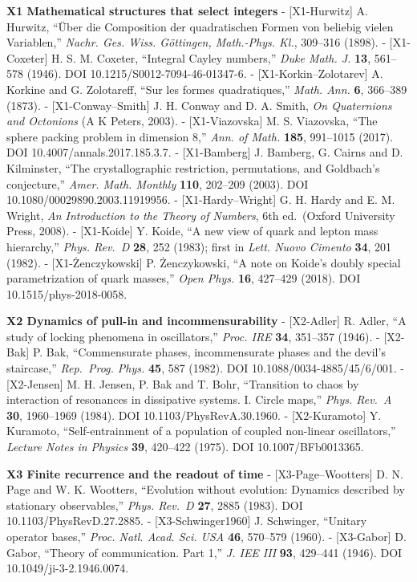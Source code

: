 \documentclass[
  a4paper,
]{article}
\begin{document}
\textbf{X1 Mathematical structures that select integers} -
{[}X1-Hurwitz{]} A. Hurwitz, ``Über die Composition der quadratischen
Formen von beliebig vielen Variablen,'' \emph{Nachr. Ges. Wiss.
Göttingen, Math.-Phys. Kl.}, 309--316 (1898). - {[}X1-Coxeter{]} H. S.
M. Coxeter, ``Integral Cayley numbers,'' \emph{Duke Math. J.}
\textbf{13}, 561--578 (1946). DOI 10.1215/S0012-7094-46-01347-6. -
{[}X1-Korkin--Zolotarev{]} A. Korkine and G. Zolotareff, ``Sur les
formes quadratiques,'' \emph{Math. Ann.} \textbf{6}, 366--389 (1873). -
{[}X1-Conway--Smith{]} J. H. Conway and D. A. Smith, \emph{On
Quaternions and Octonions} (A K Peters, 2003). - {[}X1-Viazovska{]} M.
S. Viazovska, ``The sphere packing problem in dimension 8,'' \emph{Ann.
of Math.} \textbf{185}, 991--1015 (2017). DOI
10.4007/annals.2017.185.3.7. - {[}X1-Bamberg{]} J. Bamberg, G. Cairns
and D. Kilminster, ``The crystallographic restriction, permutations, and
Goldbach's conjecture,'' \emph{Amer. Math. Monthly} \textbf{110},
202--209 (2003). DOI 10.1080/00029890.2003.11919956. -
{[}X1-Hardy--Wright{]} G. H. Hardy and E. M. Wright, \emph{An
Introduction to the Theory of Numbers}, 6th ed.~(Oxford University
Press, 2008). - {[}X1-Koide{]} Y. Koide, ``A new view of quark and
lepton mass hierarchy,'' \emph{Phys. Rev.~D} \textbf{28}, 252 (1983);
first in \emph{Lett. Nuovo Cimento} \textbf{34}, 201 (1982). -
{[}X1-Żenczykowski{]} P. Żenczykowski, ``A note on Koide's doubly
special parametrization of quark masses,'' \emph{Open Phys.}
\textbf{16}, 427--429 (2018). DOI 10.1515/phys-2018-0058.

\textbf{X2 Dynamics of pull-in and incommensurability} - {[}X2-Adler{]}
R. Adler, ``A study of locking phenomena in oscillators,'' \emph{Proc.
IRE} \textbf{34}, 351--357 (1946). - {[}X2-Bak{]} P. Bak, ``Commensurate
phases, incommensurate phases and the devil's staircase,''
\emph{Rep.~Prog. Phys.} \textbf{45}, 587 (1982). DOI
10.1088/0034-4885/45/6/001. - {[}X2-Jensen{]} M. H. Jensen, P. Bak and
T. Bohr, ``Transition to chaos by interaction of resonances in
dissipative systems. I. Circle maps,'' \emph{Phys. Rev.~A} \textbf{30},
1960--1969 (1984). DOI 10.1103/PhysRevA.30.1960. - {[}X2-Kuramoto{]} Y.
Kuramoto, ``Self-entrainment of a population of coupled non-linear
oscillators,'' \emph{Lecture Notes in Physics} \textbf{39}, 420--422
(1975). DOI 10.1007/BFb0013365.

\textbf{X3 Finite recurrence and the readout of time} -
{[}X3-Page--Wootters{]} D. N. Page and W. K. Wootters, ``Evolution
without evolution: Dynamics described by stationary observables,''
\emph{Phys. Rev.~D} \textbf{27}, 2885 (1983). DOI
10.1103/PhysRevD.27.2885. - {[}X3-Schwinger1960{]} J. Schwinger,
``Unitary operator bases,'' \emph{Proc. Natl. Acad. Sci. USA}
\textbf{46}, 570--579 (1960). - {[}X3-Gabor{]} D. Gabor, ``Theory of
communication. Part 1,'' \emph{J. IEE III} \textbf{93}, 429--441 (1946).
DOI 10.1049/ji-3-2.1946.0074.
\end{document}
